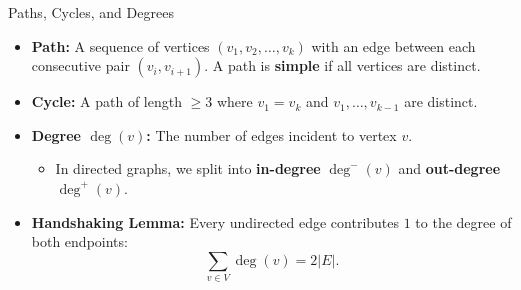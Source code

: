 \documentclass{beamer}
\begin{document}
\begin{frame}{Paths, Cycles, and Degrees}
  \begin{itemize}
    \item \textbf{Path:} A sequence of vertices $(v_1, v_2, \dots, v_k)$ with an edge between each consecutive pair $(v_i, v_{i+1})$. A path is \textbf{simple} if all vertices are distinct.
    \item \textbf{Cycle:} A path of length $\ge 3$ where $v_1 = v_k$ and $v_1, \dots, v_{k-1}$ are distinct.
    \item \textbf{Degree $\deg(v)$:} The number of edges incident to vertex $v$.
      \begin{itemize}
        \item In directed graphs, we split into \textbf{in-degree} $\deg^-(v)$ and \textbf{out-degree} $\deg^+(v)$.
      \end{itemize}
    \item \textbf{Handshaking Lemma:} Every undirected edge contributes $1$ to the degree of both endpoints:
      \[ \sum_{v \in V} \deg(v) = 2|E|. \]
  \end{itemize}
\end{frame}
\end{document}
